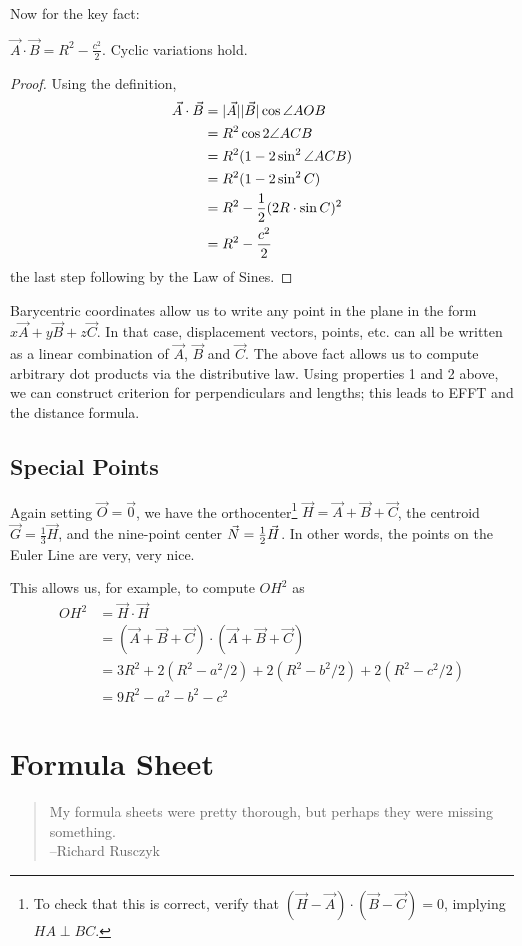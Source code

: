 Now for the key fact:
\begin{fact}
  $\vec A \cdot \vec B = R^2 - \frac{c^2}{2}$.  Cyclic variations hold.
\end{fact}
\begin{proof}
  Using the definition,
  \begin{align*}
    \vec A \cdot \vec B &= | \vec A || \vec B | \cos \angle AOB \\
    &= R^2 \cos 2\angle ACB \\
    &= R^2 (1 - 2\sin^2 \angle ACB) \\
    &= R^2 (1 - 2\sin^2 C) \\
    &= R^2 - \frac{1}{2} (2R \cdot \sin C)^2 \\
    &= R^2 - \frac{c^2}{2}
  \end{align*}
  the last step following by the Law of Sines.
\end{proof}

Barycentric coordinates allow us to write any point in the plane in the form $x \vec A + y \vec B + z \vec C$.  In that case, displacement vectors, points, etc. can all be written as a linear combination of $\vec A$, $\vec B$ and $\vec C$.  The above fact allows us to compute arbitrary dot products via the distributive law.  Using properties 1 and 2 above, we can construct criterion for perpendiculars and lengths; this leads to EFFT and the distance formula.

\section{Special Points}
Again setting $\vec O = \vec 0$, we have the orthocenter\footnote{To check that this is correct, verify that $(\vec H - \vec A) \cdot (\vec B - \vec C) = 0$, implying $HA \perp BC$.} $\vec H = \vec A + \vec B + \vec C$, the centroid $\vec G = \frac{1}{3} \vec H$, and the nine-point center $\vec N = \frac{1}{2} \vec H$.  In other words, the points on the Euler Line are very, very nice.

This allows us, for example, to compute $OH^2$ as
\begin{align*}
  OH^2 &= \vec H \cdot \vec H \\
  &= (\vec A + \vec B + \vec C) \cdot (\vec A + \vec B + \vec C) \\
  &= 3R^2 + 2(R^2-a^2/2) + 2(R^2-b^2/2) + 2(R^2-c^2/2) \\
  &= 9R^2-a^2-b^2-c^2
\end{align*}


\chapter{Formula Sheet}
\label{appendix:formulasheet}
\begin{quote}
  My formula sheets were pretty thorough, but perhaps they were missing something.
  \\ --Richard Rusczyk
\end{quote}

